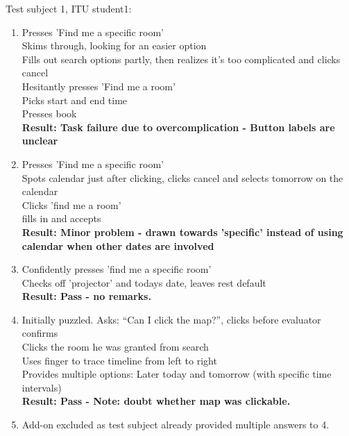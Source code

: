 Test subject 1, ITU student1:
\begin{enumerate}
\item Presses 'Find me a specific room'\\
Skims through, looking for an easier option \\
Fills out search options partly, then realizes it's too complicated and clicks cancel \\
Hesitantly presses 'Find me a room' \\
Picks start and end time \\
Presses book\\
\textbf{Result: Task failure due to overcomplication - Button labels are unclear}
\item Presses 'Find me a specific room' \\
Spots calendar just after clicking, clicks cancel and selects tomorrow on the calendar \\
Clicks 'find me a room' \\
fills in and accepts \\
\textbf{Result: Minor problem - drawn towards 'specific' instead of using calendar when other dates are involved}
\item Confidently presses 'find me a specific room' \\
Checks off 'projector' and todays date, leaves rest default \\
\textbf{Result: Pass - no remarks.}
\item Initially puzzled. Asks: ``Can I click the map?'', clicks before evaluator confirms \\
Clicks the room he was granted from search \\
Uses finger to trace timeline from left to right \\
Provides multiple options: Later today and tomorrow (with specific time intervals) \\
\textbf{Result: Pass - Note: doubt whether map was clickable. }
\item Add-on excluded as test subject already provided multiple answers to 4.
\end{enumerate}

